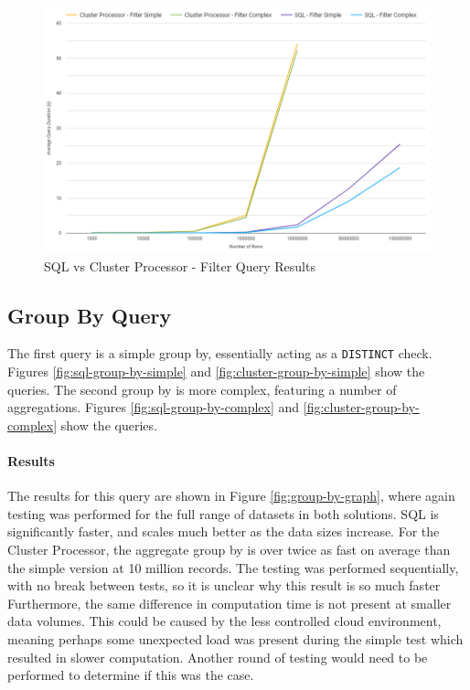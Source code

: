 \begin{figure}[ht]
	\centering
	\includegraphics[width=0.8\linewidth]{chapters/diagrams/testing/filter-1k-100m}
	\caption{SQL vs Cluster Processor - Filter Query Results}
	\label{fig:filter-graph}
\end{figure}


\subsection{Group By Query}
The first query is a simple group by, essentially acting as a \texttt{DISTINCT} check. Figures \ref{fig:sql-group-by-simple} and \ref{fig:cluster-group-by-simple} show the queries. The second group by is more complex, featuring a number of aggregations. Figures \ref{fig:sql-group-by-complex} and \ref{fig:cluster-group-by-complex} show the queries. 

\paragraph{Results}
The results for this query are shown in Figure \ref{fig:group-by-graph}, where again testing was performed for the full range of datasets in both solutions. SQL is significantly faster, and scales much better as the data sizes increase. For the Cluster Processor, the aggregate group by is over twice as fast on average than the simple version at 10 million records. The testing was performed sequentially, with no break between tests, so it is unclear why this result is so much faster Furthermore, the same difference in computation time is not present at smaller data volumes. This could be caused by the less controlled cloud environment, meaning perhaps some unexpected load was present during the simple test which resulted in slower computation. Another round of testing would need to be performed to determine if this was the case.


